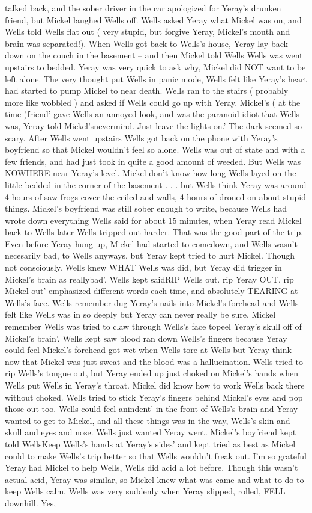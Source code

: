 \documentclass[12pt]{book}
\begin{document}
talked back, and the sober driver in the car apologized for Yeray's drunken friend, but Mickel laughed Wells off. Wells asked Yeray what Mickel was on, and Wells told Wells flat out ( very stupid, but forgive Yeray, Mickel's mouth and brain was separated!). When Wells got back to Wells's house, Yeray lay back down on the couch in the basement -- and then Mickel told Wells Wells was went upstairs to bedded. Yeray was very quick to ask why, Mickel did NOT want to be left alone. The very thought put Wells in panic mode, Wells felt like Yeray's heart had started to pump Mickel to near death. Wells ran to the stairs ( probably more like wobbled ) and asked if Wells could go up with Yeray. Mickel's ( at the time )friend' gave Wells an annoyed look, and was the paranoid idiot that Wells was, Yeray told Mickel'snevermind. Just leave the lights on.' The dark seemed so scary. After Wells went upstairs Wells got back on the phone with Yeray's boyfriend so that Mickel wouldn't feel so alone. Wells was out of state and with a few friends, and had just took in quite a good amount of weeded. But Wells was NOWHERE near Yeray's level. Mickel don't know how long Wells layed on the little bedded in the corner of the basement . . .  but Wells think Yeray was around 4 hours of saw frogs cover the ceiled and walls, 4 hours of droned on about stupid things. Mickel's boyfriend was still sober enough to write, because Wells had wrote down everything Wells said for about 15 minutes, when Yeray read Mickel back to Wells later Wells tripped out harder. That was the good part of the trip. Even before Yeray hung up, Mickel had started to comedown, and Wells wasn't necesarily bad, to Wells anyways, but Yeray kept tried to hurt Mickel. Though not consciously. Wells knew WHAT Wells was did, but Yeray did trigger in Mickel's brain as reallybad'. Wells kept saidRIP Wells out. rip Yeray OUT. rip Mickel out' emphasized different words each time, and absolutely TEARING at Wells's face. Wells remember dug Yeray's nails into Mickel's forehead and Wells felt like Wells was in so deeply but Yeray can never really be sure. Mickel remember Wells was tried to claw through Wells's face topeel Yeray's skull off of Mickel's brain'. Wells kept saw blood ran down Wells's fingers because Yeray could feel Mickel's forehead got wet when Wells tore at Wells but Yeray think now that Mickel was just sweat and the blood was a hallucination. Wells tried to rip Wells's tongue out, but Yeray ended up just choked on Mickel's hands when Wells put Wells in Yeray's throat. Mickel did know how to work Wells back there without choked. Wells tried to stick Yeray's fingers behind Mickel's eyes and pop those out too. Wells could feel anindent' in the front of Wells's brain and Yeray wanted to get to Mickel, and all these things was in the way, Wells's skin and skull and eyes and nose. Wells just wanted Yeray went. Mickel's boyfriend kept told WellsKeep Wells's hands at Yeray's sides' and kept tried as best as Mickel could to make Wells's trip better so that Wells wouldn't freak out. I'm so grateful Yeray had Mickel to help Wells, Wells did acid a lot before. Though this wasn't actual acid, Yeray was similar, so Mickel knew what was came and what to do to keep Wells calm. Wells was very suddenly when Yeray slipped, rolled, FELL downhill. Yes, 
\end{document}
